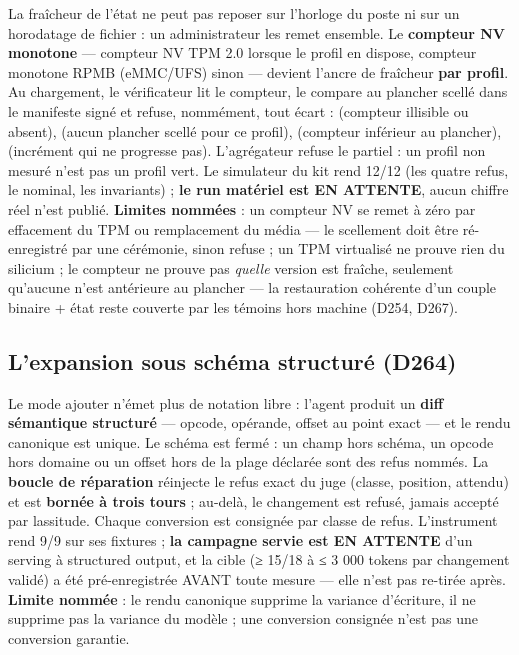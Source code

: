 La fraîcheur de l'état ne peut pas reposer sur l'horloge du poste ni sur un horodatage de
fichier : un administrateur les remet ensemble. Le \textbf{compteur NV monotone} — compteur
NV TPM 2.0 lorsque le profil en dispose, compteur monotone RPMB (eMMC/UFS) sinon — devient
l'ancre de fraîcheur \textbf{par profil}. Au chargement, le vérificateur lit le compteur,
le compare au plancher scellé dans le manifeste signé et refuse, nommément, tout écart :
 (compteur illisible ou absent),  (aucun
plancher scellé pour ce profil),  (compteur inférieur au plancher),
 (incrément qui ne progresse pas). L'agrégateur refuse le
partiel : un profil non mesuré n'est pas un profil vert. Le simulateur du kit rend 12/12
(les quatre refus, le nominal, les invariants) ; \textbf{le run matériel est EN ATTENTE},
aucun chiffre réel n'est publié. \textbf{Limites nommées} : un compteur NV se remet à zéro
par effacement du TPM ou remplacement du média — le scellement doit être ré-enregistré par
une cérémonie, sinon  refuse ; un TPM virtualisé ne prouve
rien du silicium ; le compteur ne prouve pas \emph{quelle} version est fraîche, seulement
qu'aucune n'est antérieure au plancher — la restauration cohérente d'un couple binaire +
état reste couverte par les témoins hors machine (D254, D267).

\subsection{L'expansion sous schéma structuré (D264)}\label{sec:expansion}

Le mode ajouter n'émet plus de notation libre : l'agent produit un \textbf{diff sémantique
structuré} — opcode, opérande, offset au point exact — et le rendu canonique est unique.
Le schéma est fermé : un champ hors schéma, un opcode hors domaine ou un offset hors de la
plage déclarée sont des refus nommés. La \textbf{boucle de réparation} réinjecte le refus
exact du juge (classe, position, attendu) et est \textbf{bornée à trois tours} ; au-delà,
le changement est refusé, jamais accepté par lassitude. Chaque conversion est consignée par
classe de refus. L'instrument rend 9/9 sur ses fixtures ; \textbf{la campagne servie est EN
ATTENTE} d'un serving à structured output, et la cible (≥ 15/18 à ≤ 3 000 tokens par
changement validé) a été pré-enregistrée AVANT toute mesure — elle n'est pas re-tirée après.
\textbf{Limite nommée} : le rendu canonique supprime la variance d'écriture, il ne supprime
pas la variance du modèle ; une conversion consignée n'est pas une conversion garantie.

